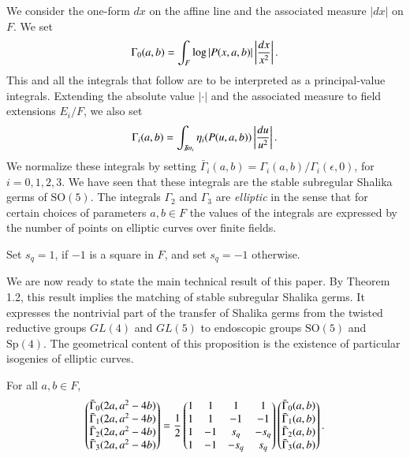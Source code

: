 \documentclass{amsart}
\newcommand\leftd[1]{\left | {d#1\over #1^2}\right |}
\newcommand\leftdx{\leftd x}
\newcommand\leftdu{\leftd u}
\newcommand\Imm{{\mathcal I\hskip-.2em m}}
\newcommand\bGamma{\bar\Gamma}
\newenvironment{cthm}[1]
  {\renewcommand\thethm{\sc #1}\thm}
  {\endthm}
\begin{document}
We consider the one-form $dx$ on the affine line and the associated
measure $|dx|$ on $F$.  We set
$$\Gamma_0(a,b) = \int_{F} \log|P(x,a,b)| \leftdx.$$
This and all the integrals that follow  are
to be interpreted as a principal-value integrals.
Extending the absolute value $|\cdot|$ and the associated measure
to field extensions $E_i/F$, we also set
$$\Gamma_i(a,b) = \int_{\Imm_i} \eta_i(P(u,a,b))\leftdu.$$
We normalize these integrals by setting $\bGamma_i(a,b) =
\Gamma_i(a,b)/\Gamma_i(\epsilon,0)$, for $i=0,1,2,3$.
We have seen that these integrals are the stable
subregular Shalika germs of $\text{SO}(5)$.
The integrals $\Gamma_2$ and $\Gamma_3$ are {\it elliptic} in the
sense that for certain choices of parameters $a,b\in F$ the values
of the integrals are expressed by the number of points on elliptic
curves over finite fields.

Set $s_q = 1$, if $-1$ is a square in $F$, and set $s_q=-1$ otherwise.

We are now ready to state the main technical result of this paper.  
By Theorem 1.2, this result implies the matching of stable
subregular Shalika germs.
It expresses
the nontrivial part of the transfer of Shalika
germs from the twisted reductive groups $GL(4)$ and $GL(5)$ to 
endoscopic groups $\text{SO}(5)$ and $\text{Sp}(4)$.  The geometrical
content of this proposition is the existence of particular isogenies of
elliptic curves.
\bigskip

\noindent
\begin{cthm}{Proposition 2.1}  For all $a,b\in F$,
$$\begin{pmatrix}\bGamma_0(2a,a^2-4b) \\
          \bGamma_1(2a,a^2-4b) \\
          \bGamma_2(2a,a^2-4b) \\
          \bGamma_3(2a,a^2-4b) \end{pmatrix}
= {1\over 2}
\begin{pmatrix}1&1&1&1\\
        1&1&-1&-1\\
        1&-1&s_q&-s_q\\
        1&-1&-s_q&s_q\end{pmatrix}
\begin{pmatrix}\bGamma_0(a,b)\\
        \bGamma_1(a,b)\\
        \bGamma_2(a,b)\\
        \bGamma_3(a,b)\end{pmatrix}.
$$
\end{cthm}
\end{document}
